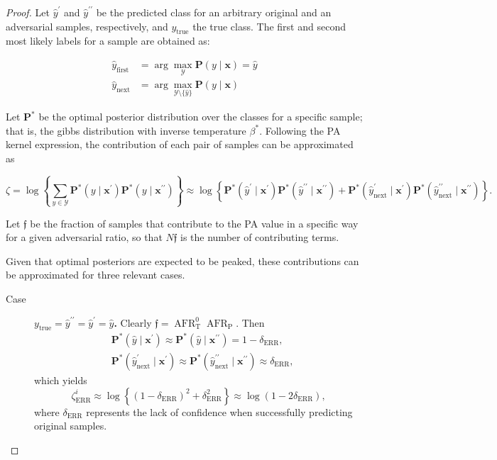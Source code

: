 \begin{proof}
    Let $\hat{y}^\prime$ and $\hat{y}^{\prime \prime}$ be the predicted class for an arbitrary 
    original and an adversarial samples, respectively, and $y_{\text{true}}$ the true class. The first and second
    most likely labels for a sample are obtained as:

    $$
    \begin{aligned}
        \hat{y}_{\text{first}} &= \arg \max_{\mathcal{Y}} \mathbf{P}(y \mid \bm{x}) = \hat{y} \\
        \hat{y}_{\text{next}} &= \arg \max_{\mathcal{Y} \setminus \{ \hat{y} \} } \mathbf{P}(y \mid \bm{x})
    \end{aligned}
    $$

    Let $\mathbf{P}^{*}$ be the optimal posterior distribution over the classes for a
    specific sample; that is, the gibbs distribution with inverse temperature $\beta^{*}$. Following the PA kernel
    expression, the contribution of each pair of samples can be approximated as

    $$
    \zeta = \log \left\{ \sum_{y \in \mathcal{Y}} \mathbf{P}^{*}(y \mid \bm{x}^\prime) \mathbf{P}^{*}(y \mid \bm{x}^{\prime \prime}) \right\}
    \approx \log \left\{ \mathbf{P}^{*}(\hat{y}^\prime \mid \bm{x}^\prime) \mathbf{P}^{*}(\hat{y}^{\prime \prime} \mid \bm{x}^{\prime \prime}) + \mathbf{P}^{*}(\hat{y}_{\text{next}}^\prime \mid \bm{x}^\prime) \mathbf{P}^{*}(\hat{y}_{\text{next}}^{\prime \prime} \mid \bm{x}^{\prime \prime})\right\}.
    $$
    
    Let $\mathfrak{f}$ be the fraction of samples that contribute to the PA value in a specific way for a given
    adversarial ratio, so that $N \mathfrak{f}$ is the number of contributing terms.
    
    Given that optimal posteriors
    are expected to be peaked, these contributions can be approximated for three relevant cases.

    \begin{description}
        \item[Case] $y_{\text{true}} = \hat{y}^{\prime \prime} = \hat{y}^{\prime} = \hat{y}$\textbf{.} Clearly 
        $\mathfrak{f} = \operatorname{AFR}^0_{\text{T}} \operatorname{AFR}_{\text{P}}$. Then
        $$
        \begin{aligned}
            & \mathbf{P}^{*}(\hat{y} \mid \bm{x}^\prime) \approx \mathbf{P}^{*}(\hat{y} \mid \bm{x}^{\prime \prime}) = 1 - \delta_{\text{ERR}}, \\
            & \mathbf{P}^{*}(\hat{y}_{\text{next}}^{\prime}  \mid \bm{x}^\prime) \approx \mathbf{P}^{*}(\hat{y}_{\text{next}}^{\prime \prime}  \mid \bm{x}^{\prime \prime}) \approx \delta_{\text{ERR}},
        \end{aligned}
        $$
        which yields
        $$
        \zeta_{\text{ERR}}^i \approx \log \left\{ \left(1 - \delta_{\text{ERR}} \right)^2 +  \delta_{\text{ERR}}^ 2 \right\} \approx \log \left( 1 - 2\delta_{\text{ERR}} \right) ,
        $$
        where $\delta_{\text{ERR}}$ represents the lack of confidence when successfully predicting original samples.
        

\end{description}
\end{proof}
